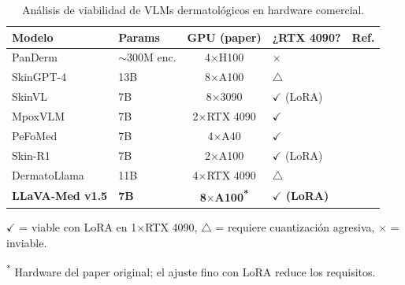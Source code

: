 \documentclass[11pt, a4paper]{article}
\begin{document}
\begin{table}[H]
\centering
\begin{threeparttable}
\caption{Análisis de viabilidad de VLMs dermatológicos en hardware comercial.}
\label{tab:viabilidad}
\small
\begin{tabular}{@{}llcll@{}}
\toprule
\textbf{Modelo} & \textbf{Params} & \textbf{GPU (paper)} & \textbf{¿RTX 4090?} & \textbf{Ref.} \\
\midrule
PanDerm & $\sim$300M enc. & 4$\times$H100 & $\times$ & \cite{yan_panderm_2024} \\
SkinGPT-4 & 13B & 8$\times$A100 & $\triangle$ & \cite{zhou_skingpt4_2024} \\
SkinVL & 7B & 8$\times$3090 & $\checkmark$ (LoRA) & \cite{zhao_mm-skin_2025} \\
MpoxVLM & 7B & 2$\times$RTX 4090 & $\checkmark$ & \cite{xu_mpoxvlm_2024} \\
PeFoMed & 7B & 4$\times$A40 & $\checkmark$ & \cite{he_pefomed_2024} \\
Skin-R1 & 7B & 2$\times$A100 & $\checkmark$ (LoRA) & \cite{kang_skinr1_2025} \\
DermatoLlama & 11B & 4$\times$RTX 4090 & $\triangle$ & \cite{yilmaz_dermatollama_2025} \\
\midrule
\rowcolor{yellow!20}
\textbf{LLaVA-Med v1.5} & \textbf{7B} & \textbf{8$\times$A100\textsuperscript{*}} & \textbf{$\checkmark$ (LoRA)} & \textbf{\cite{li_llava-med_2023}} \\
\bottomrule
\end{tabular}
\begin{tablenotes}
\small
\item $\checkmark$ = viable con LoRA en 1$\times$RTX 4090, $\triangle$ = requiere cuantización agresiva, $\times$ = inviable.
\item \textsuperscript{*} Hardware del paper original; el ajuste fino con LoRA reduce los requisitos.
\end{tablenotes}
\end{threeparttable}
\end{table}
\end{document}
